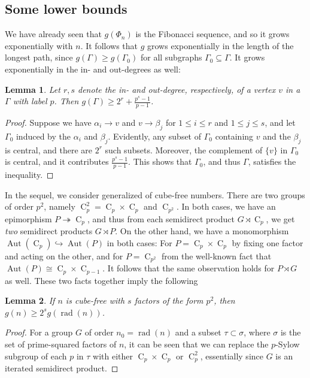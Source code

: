 \documentclass[a4paper, 12pt]{article}
\newcommand{\aut}[1]{\operatorname{Aut}(#1)}
\newcommand{\cyc}[1]{\operatorname{C}_{#1}}
\theoremstyle{plain}
\newtheorem{lem}{Lemma}[section]
\theoremstyle{definition}
\begin{document}
\subsection{Some lower bounds}
We have already seen that $g(\Phi_n)$ is the Fibonacci sequence, and so it grows exponentially with $n$. It follows that $g$ grows exponentially in the length of the longest path, since $g(\Gamma) \ge  g(\Gamma_0)$ for all subgraphs $\Gamma_0 \subseteq \Gamma$. It grows exponentially in the in- and out-degrees as well:
\begin{lem}
	Let $r, s$ denote the in- and out-degree, respectively, of a vertex $v$ in a  $\Gamma$ with label $p$. Then $g(\Gamma) \ge 2^r + \frac{p^s - 1}{p - 1}$.
\end{lem}
\begin{proof}
	Suppose we have $\alpha_i \rightarrow v$ and $v \rightarrow \beta_j$ for $1 \le i \le r$ and $1 \le j \le s$, and let $\Gamma_0$ induced by the $\alpha_i$ and $\beta_j$. Evidently, any subset of $\Gamma_0$ containing $v$ and the $\beta_j$ is central, and there are $2^r$ such subsets. Moreover, the complement of $\{v\}$ in $\Gamma_0$ is central, and it contributes \nolinebreak[4] $\frac{p^s - 1}{p - 1}$. This shows that $\Gamma_0$, and thus $\Gamma$, satisfies the inequality.
\end{proof}
In the sequel, we consider generalized  of cube-free numbers. There are two groups of order $p^2$, namely $\cyc{p}^2 = \cyc{p} \times \cyc{p}$ and $\cyc{p^2}$. In both cases, we have an epimorphism $P \twoheadrightarrow \cyc{p}$, and thus from each semidirect product $G \rtimes \cyc{p}$, we get \textit{two} semidirect products $G \rtimes P$. On the other hand, we have a monomorphism $\aut{\cyc{p}} \hookrightarrow \aut{P}$ in both cases: For $P = \cyc{p} \times \cyc{p}$ by fixing one factor and acting on the other, and for $P = \cyc{p^2}$ from the well-known fact that $\aut{P} \cong \cyc{p} \times \cyc{p - 1}$. It follows that the same observation holds for $P \rtimes G$ as well. These two facts together imply the following

\begin{lem}
	If $n$ is cube-free with $s$ factors of the form $p^2$, then $g(n) \ge 2^s g(\operatorname{rad}(n))$.
\end{lem}
\begin{proof}
	For a group $G$ of order $n_0 = \operatorname{rad}(n)$ and a subset $\tau \subset \sigma$, where $\sigma$ is the set of prime-squared factors of $n$, it can be seen that we can replace the $p$-Sylow subgroup of each $p$ in $\tau$ with either $\cyc{p} \times \cyc{p}$ or $\cyc{p}^2$, essentially since $G$ is an iterated semidirect product.
\end{proof}
\end{document}
